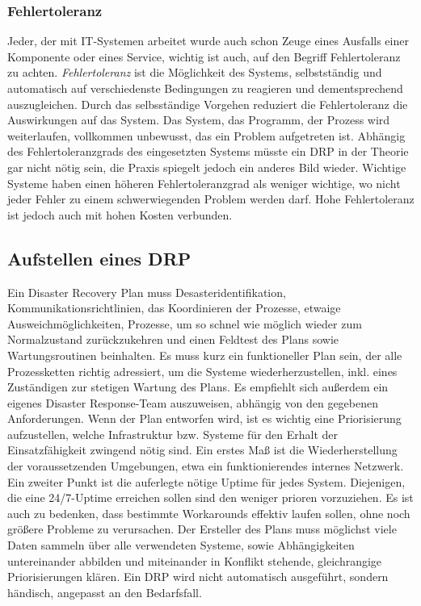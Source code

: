 \documentclass[letterpaper, 12pt]{article}
\let\tempsubsection\subsection
\renewcommand\subsection[1]{\vspace{0cm}\tempsubsection{#1}\vspace{0cm}}
\let\tempsubsubsection\subsubsection
\renewcommand\subsubsection[1]{\vspace{0cm}\tempsubsubsection{#1}\vspace{0cm}}
\begin{document}
\newpage

\subsubsection{Fehlertoleranz}

Jeder, der mit IT-Systemen arbeitet wurde auch schon Zeuge eines Ausfalls einer Komponente oder eines Service, wichtig ist auch, auf den Begriff Fehlertoleranz zu achten. \textit{Fehlertoleranz} ist die Möglichkeit des Systems, selbstständig und automatisch auf verschiedenste Bedingungen zu reagieren und dementsprechend auszugleichen. Durch das selbsständige Vorgehen reduziert die Fehlertoleranz die Auswirkungen auf das System. Das System, das Programm, der Prozess wird weiterlaufen, vollkommen unbewusst, das ein Problem aufgetreten ist. Abhängig des Fehlertoleranzgrads des eingesetzten Systems müsste ein DRP in der Theorie gar nicht nötig sein, die Praxis spiegelt jedoch ein anderes Bild wieder. Wichtige Systeme haben einen höheren Fehlertoleranzgrad als weniger wichtige, wo nicht jeder Fehler zu einem schwerwiegenden Problem werden darf. Hohe Fehlertoleranz ist jedoch auch mit hohen Kosten verbunden.

\subsection{Aufstellen eines DRP \cite{booktwo}}

Ein Disaster Recovery Plan muss Desasteridentifikation, Kommunikationsrichtlinien, 
das Koordinieren der Prozesse, etwaige Ausweichmöglichkeiten, Prozesse, um so schnel wie möglich wieder 
zum Normalzustand zurückzukehren und einen Feldtest des Plans sowie Wartungsroutinen beinhalten. 
Es muss kurz ein funktioneller Plan sein, der alle Prozessketten richtig adressiert, um die 
Systeme wiederherzustellen, inkl. eines Zuständigen zur stetigen Wartung des Plans.
Es empfiehlt sich außerdem ein eigenes Disaster Response-Team auszuweisen, abhängig von den
gegebenen Anforderungen. Wenn der Plan entworfen wird, ist es wichtig eine Priorisierung aufzustellen,
welche Infrastruktur bzw. Systeme für den Erhalt der Einsatzfähigkeit zwingend nötig sind. Ein erstes Maß
ist die Wiederherstellung der voraussetzenden Umgebungen, etwa ein funktionierendes internes Netzwerk. Ein 
zweiter Punkt ist die auferlegte nötige Uptime für jedes System. Diejenigen, die eine 24/7-Uptime erreichen sollen
sind den weniger prioren vorzuziehen.
Es ist auch zu bedenken, dass bestimmte Workarounds effektiv laufen sollen, ohne noch größere Probleme
zu verursachen. Der Ersteller des Plans muss möglichst viele Daten sammeln über alle verwendeten Systeme,
sowie Abhängigkeiten untereinander abbilden und miteinander in Konflikt stehende, gleichrangige Priorisierungen klären. Ein DRP wird nicht automatisch ausgeführt, sondern händisch, angepasst an den Bedarfsfall.
\end{document}
